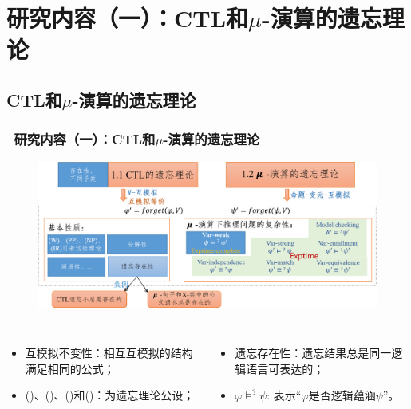 \documentclass[aspectratio=1610, 9pt, CJK]{beamer}
\begin{document}
	
\section{研究内容（一）：CTL和$\mu$-演算的遗忘理论}
\subsection{CTL和$\mu$-演算的遗忘理论}  
\begin{frame}  
	\frametitle{~研究内容（一）：CTL和$\mu$-演算的遗忘理论}
	\begin{figure}
		\includegraphics[scale=0.45]{figures/ctlMuForgFrame1}
	\end{figure}
	{\tiny 
		\begin{columns}
			\begin{itemize} 
				\item 互模拟不变性：相互互模拟的结构满足相同的公式；
				\item (\W)、(\PP)、(\NgP)和(\IR)：为遗忘理论公设；
			\end{itemize}
			\begin{itemize}
				\item 遗忘存在性：遗忘结果总是同一逻辑语言可表达的；
				\item $\varphi \models^? \psi$: 表示“$\varphi$是否逻辑蕴涵$\psi$”。
			\end{itemize}
		\end{columns}
	}

\end{frame}
\end{document}
